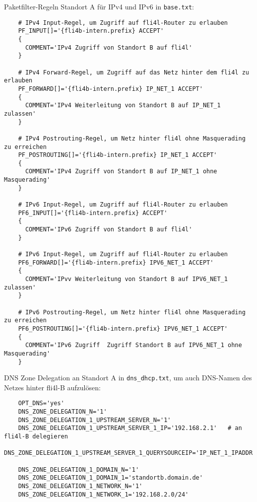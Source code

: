 Paketfilter-Regeln Standort A für IPv4 und IPv6 in \verb+base.txt+:

\begin{example}
\begin{verbatim}
    # IPv4 Input-Regel, um Zugriff auf fli4l-Router zu erlauben
    PF_INPUT[]='{fli4b-intern.prefix} ACCEPT'
    {
      COMMENT='IPv4 Zugriff von Standort B auf fli4l'
    }
    
    # IPv4 Forward-Regel, um Zugriff auf das Netz hinter dem fli4l zu erlauben
    PF_FORWARD[]='{fli4b-intern.prefix} IP_NET_1 ACCEPT'
    {
      COMMENT='IPv4 Weiterleitung von Standort B auf IP_NET_1 zulassen'
    }
    
    # IPv4 Postrouting-Regel, um Netz hinter fli4l ohne Masquerading zu erreichen
    PF_POSTROUTING[]='{fli4b-intern.prefix} IP_NET_1 ACCEPT'
    {
      COMMENT='IPv4 Zugriff von Standort B auf IP_NET_1 ohne Masquerading'
    }

    # IPv6 Input-Regel, um Zugriff auf fli4l-Router zu erlauben
    PF6_INPUT[]='{fli4b-intern.prefix} ACCEPT'
    {
      COMMENT='IPv6 Zugriff von Standort B auf fli4l'
    }
    
    # IPv6 Input-Regel, um Zugriff auf fli4l-Router zu erlauben
    PF6_FORWARD[]='{fli4b-intern.prefix} IPV6_NET_1 ACCEPT'
    {
      COMMENT='IPvv Weiterleitung von Standort B auf IPV6_NET_1 zulassen'
    }
    
    # IPv6 Postrouting-Regel, um Netz hinter fli4l ohne Masquerading zu erreichen
    PF6_POSTROUTING[]='{fli4b-intern.prefix} IPV6_NET_1 ACCEPT'
    {
      COMMENT='IPv6 Zugriff  Zugriff Standort B auf IPV6_NET_1 ohne Masquerading'
    }
\end{verbatim}
\end{example}


DNS Zone Delegation an Standort A in \verb+dns_dhcp.txt+, um auch DNS-Namen des Netzes hinter fli4l-B aufzulösen:

\begin{example}
\begin{verbatim}
    OPT_DNS='yes'
    DNS_ZONE_DELEGATION_N='1'
    DNS_ZONE_DELEGATION_1_UPSTREAM_SERVER_N='1'
    DNS_ZONE_DELEGATION_1_UPSTREAM_SERVER_1_IP='192.168.2.1'   # an fli4l-B delegieren
    DNS_ZONE_DELEGATION_1_UPSTREAM_SERVER_1_QUERYSOURCEIP='IP_NET_1_IPADDR'

    DNS_ZONE_DELEGATION_1_DOMAIN_N='1'
    DNS_ZONE_DELEGATION_1_DOMAIN_1='standortb.domain.de'
    DNS_ZONE_DELEGATION_1_NETWORK_N='1'
    DNS_ZONE_DELEGATION_1_NETWORK_1='192.168.2.0/24'
\end{verbatim}
\end{example}

